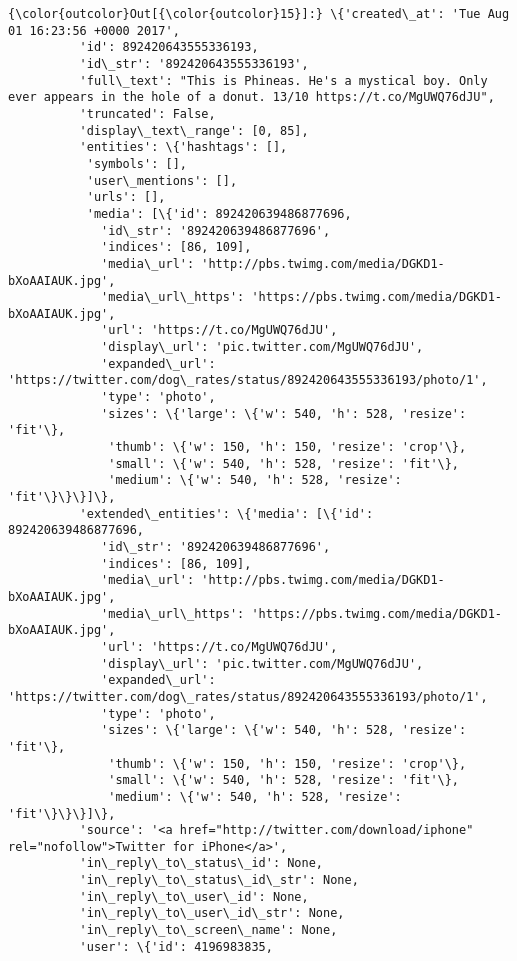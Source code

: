 \documentclass[11pt]{article}
\begin{document}
\begin{Verbatim}[commandchars=\\\{\}]
{\color{outcolor}Out[{\color{outcolor}15}]:} \{'created\_at': 'Tue Aug 01 16:23:56 +0000 2017',
          'id': 892420643555336193,
          'id\_str': '892420643555336193',
          'full\_text': "This is Phineas. He's a mystical boy. Only ever appears in the hole of a donut. 13/10 https://t.co/MgUWQ76dJU",
          'truncated': False,
          'display\_text\_range': [0, 85],
          'entities': \{'hashtags': [],
           'symbols': [],
           'user\_mentions': [],
           'urls': [],
           'media': [\{'id': 892420639486877696,
             'id\_str': '892420639486877696',
             'indices': [86, 109],
             'media\_url': 'http://pbs.twimg.com/media/DGKD1-bXoAAIAUK.jpg',
             'media\_url\_https': 'https://pbs.twimg.com/media/DGKD1-bXoAAIAUK.jpg',
             'url': 'https://t.co/MgUWQ76dJU',
             'display\_url': 'pic.twitter.com/MgUWQ76dJU',
             'expanded\_url': 'https://twitter.com/dog\_rates/status/892420643555336193/photo/1',
             'type': 'photo',
             'sizes': \{'large': \{'w': 540, 'h': 528, 'resize': 'fit'\},
              'thumb': \{'w': 150, 'h': 150, 'resize': 'crop'\},
              'small': \{'w': 540, 'h': 528, 'resize': 'fit'\},
              'medium': \{'w': 540, 'h': 528, 'resize': 'fit'\}\}\}]\},
          'extended\_entities': \{'media': [\{'id': 892420639486877696,
             'id\_str': '892420639486877696',
             'indices': [86, 109],
             'media\_url': 'http://pbs.twimg.com/media/DGKD1-bXoAAIAUK.jpg',
             'media\_url\_https': 'https://pbs.twimg.com/media/DGKD1-bXoAAIAUK.jpg',
             'url': 'https://t.co/MgUWQ76dJU',
             'display\_url': 'pic.twitter.com/MgUWQ76dJU',
             'expanded\_url': 'https://twitter.com/dog\_rates/status/892420643555336193/photo/1',
             'type': 'photo',
             'sizes': \{'large': \{'w': 540, 'h': 528, 'resize': 'fit'\},
              'thumb': \{'w': 150, 'h': 150, 'resize': 'crop'\},
              'small': \{'w': 540, 'h': 528, 'resize': 'fit'\},
              'medium': \{'w': 540, 'h': 528, 'resize': 'fit'\}\}\}]\},
          'source': '<a href="http://twitter.com/download/iphone" rel="nofollow">Twitter for iPhone</a>',
          'in\_reply\_to\_status\_id': None,
          'in\_reply\_to\_status\_id\_str': None,
          'in\_reply\_to\_user\_id': None,
          'in\_reply\_to\_user\_id\_str': None,
          'in\_reply\_to\_screen\_name': None,
          'user': \{'id': 4196983835,

\end{Verbatim}
\end{document}
